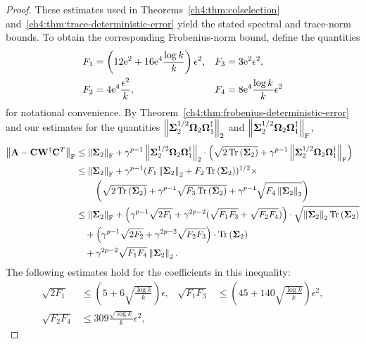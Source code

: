 \begin{proof}
These estimates used in 
Theorems~\ref{ch4:thm:colselection}
and~\ref{ch4:thm:trace-deterministic-error} 
yield the stated spectral and trace-norm bounds. To obtain the corresponding Frobenius-norm bound, define the quantities 
\begin{align*}
 F_1 & = \left( 12 \mathrm{e}^2 + 16 \mathrm{e}^4 \frac{\log k}{k} \right) \epsilon^2, &
 F_3 & = 3 \mathrm{e}^2 \epsilon^2, \\
 F_2 & = 4 \mathrm{e}^4 \frac{\epsilon^2}{k}, &
 F_4 & = 8 \mathrm{e}^4 \frac{\log k}{k} \epsilon^2
\end{align*}
for notational convenience.
By Theorem~\ref{ch4:thm:frobenius-deterministic-error} and our estimates for the quantities
$\left\|\mathbf{\Sigma}_2^{1/2} \mathbf{\Omega}_2 \mathbf{\Omega}_1^\dagger\right\|_2 $ and 
$\left\|\mathbf{\Sigma}_2^{1/2} \mathbf{\Omega}_2 \mathbf{\Omega}_1^\dagger\right\|_\mathrm{F}$, 
\begin{equation}
\label{ch4:eqn:gaussian-frob-bound-intermediate}
\begin{aligned}
 \left\|\mathbf{A} - \mathbf{C} \mathbf{W}^\dagger \mathbf{C}^T\right\|_\mathrm{F} & \leq 
 \left\|\mathbf{\Sigma}_2\right\|_\mathrm{F} 
   + \gamma^{p-1} \left\|\mathbf{\Sigma}_2^{1/2} \mathbf{\Omega}_2 \mathbf{\Omega}_1^\dagger\right\|_2 
     \cdot \left( \sqrt{2 \operatorname{Tr}\left(\mathbf{\Sigma}_2\right)} 
       + \gamma^{p-1} \left\|\mathbf{\Sigma}_2^{1/2} \mathbf{\Omega}_2 \mathbf{\Omega}_1^\dagger\right\|_\mathrm{F} 
     \right) \\
  & \leq \left\|\mathbf{\Sigma}_2\right\|_\mathrm{F} 
   + \gamma^{p-1} (F_1 \left\|\mathbf{\Sigma}_2\right\|_2 + F_2 \operatorname{Tr}\left(\mathbf{\Sigma}_2\right))^{1/2} 
     \times \\
  & \quad \quad \left( \sqrt{2 \operatorname{Tr}\left(\mathbf{\Sigma}_2\right)} 
       + \gamma^{p-1} \sqrt{ F_3 \operatorname{Tr}\left(\mathbf{\Sigma}_2\right)} +  \gamma^{p-1}\sqrt{F_4 \left\|\mathbf{\Sigma}_2\right\|_2} 
     \right) \\
  & \leq \left\|\mathbf{\Sigma}_2\right\|_\mathrm{F} + \left( \gamma^{p-1} \sqrt{2 F_1} 
         + \gamma^{2p-2} (\sqrt{F_1F_3} + \sqrt{F_2 F_4}) \right)
    \cdot \sqrt{\left\|\mathbf{\Sigma}_2\right\|_2 \operatorname{Tr}\left(\mathbf{\Sigma}_2\right)} \\
& \quad + \left( \gamma^{p-1} \sqrt{2 F_2} 
          + \gamma^{2p-2} \sqrt{F_2 F_3} \right)
    \cdot \operatorname{Tr}\left(\mathbf{\Sigma}_2\right) \\
& \quad + \gamma^{2p-2} \sqrt{F_1 F_4} \left\|\mathbf{\Sigma}_2\right\|_2.
\end{aligned}
\end{equation}
The following estimates hold for the coefficients in this inequality:
\begin{align*}
\sqrt{2 F_1} & \leq 
  \left( 5 + 6 \sqrt{\frac{\log k}{k}} \right) \epsilon, &
\sqrt{F_1 F_3} & \leq 
 \left(45 + 140 \sqrt{\frac{\log k}{k}} \right) \epsilon^2, \\
\sqrt{F_2 F_4} & \leq 309 \frac{\sqrt{\log k}}{k}\epsilon^2, &

\end{align*}
\end{proof}
